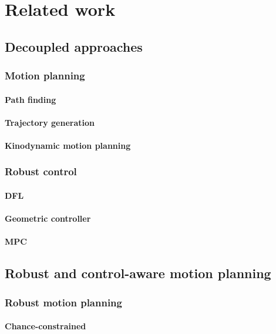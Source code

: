 \chapter{Related work}

\section{Decoupled approaches}
\subsection{Motion planning}
\subsubsection{Path finding}
\subsubsection{Trajectory generation}
\subsubsection{Kinodynamic motion planning}
\subsection{Robust control}
\subsubsection{DFL}
\subsubsection{Geometric controller}
\subsubsection{MPC}

\section{Robust and control-aware motion planning}
\subsection{Robust motion planning}
\subsubsection{Chance-constrained}
